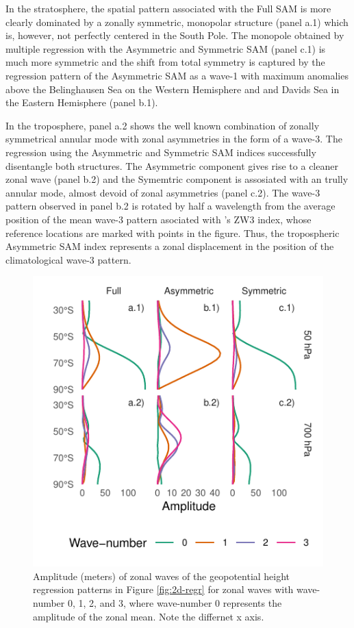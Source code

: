 \documentclass[]{ametsocV5}
\begin{document}
In the stratosphere, the spatial pattern associated with the Full SAM is
more clearly dominated by a zonally symmetric, monopolar structure
(panel a.1) which is, however, not perfectly centered in the South Pole.
The monopole obtained by multiple regression with the Asymmetric and
Symmetric SAM (panel c.1) is much more symmetric and the shift from
total symmetry is captured by the regression pattern of the Asymmetric
SAM as a wave-1 with maximum anomalies above the Belinghausen Sea on the
Western Hemisphere and and Davids Sea in the Eastern Hemisphere (panel
b.1).

In the troposphere, panel a.2 shows the well known combination of
zonally symmetrical annular mode with zonal asymmetries in the form of a
wave-3. The regression using the Asymmetric and Symmetric SAM indices
successfully disentangle both structures. The Asymmetric component gives
rise to a cleaner zonal wave (panel b.2) and the Symemtric component is
assosiated with an trully annular mode, almost devoid of zonal
asymmetries (panel c.2). The wave-3 pattern observed in panel b.2 is
rotated by half a wavelength from the average position of the mean
wave-3 pattern asociated with \citet{raphael2004}'s ZW3 index, whose
reference locations are marked with points in the figure. Thus, the
tropospheric Asymmetric SAM index represents a zonal displacement in the
position of the climatological wave-3 pattern.

\begin{figure}
\includegraphics{wave-amplitude-1} \caption{Amplitude (meters) of zonal waves of the geopotential height regression patterns in Figure \ref{fig:2d-regr} for zonal waves with wave-number 0, 1, 2, and 3, where wave-number 0 represents the amplitude of the zonal mean. Note the differnet x axis.}\label{fig:wave-amplitude}
\end{figure}
\end{document}

